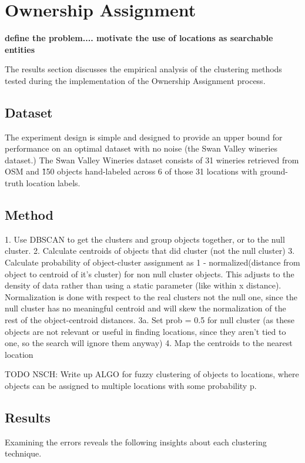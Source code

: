 \section{Ownership Assignment}
\label{section:ownership}

\textbf{define the problem.... motivate the use of locations as searchable entities}


The results section discusses the empirical analysis of the clustering methods tested during the implementation of the Ownership Assignment process. 

\subsection{Dataset}
The experiment design is simple and designed to provide an upper bound for performance on an optimal dataset with no noise (the Swan Valley wineries dataset.) 
The Swan Valley Wineries dataset consists of 31 wineries retrieved from OSM and \~150 objects hand-labeled across 6 of those 31 locations with ground-truth location labels.


\subsection{Method}
1. Use DBSCAN to get the clusters and group objects together, or to the null cluster.
2. Calculate centroids of objects that did cluster (not the null cluster)
3. Calculate probability of object-cluster assignment as 1 - normalized(distance from object to centroid of it's cluster) for non null cluster objects. This adjusts to the density of data rather than using a static parameter (like within x distance). Normalization is done with respect to the real clusters not the null one, since the null cluster has no meaningful centroid and will skew the normalization of the rest of the object-centroid distances.
3a. Set prob = 0.5 for null cluster (as these objects are not relevant or useful in finding locations, since they aren't tied to one, so the search will ignore them anyway)
4. Map the centroids to the nearest location

TODO NSCH: Write up ALGO for fuzzy clustering of objects to locations, where objects can be assigned to multiple locations with some probability p.


\subsection{Results}
Examining the errors reveals the following insights about each clustering technique. 

